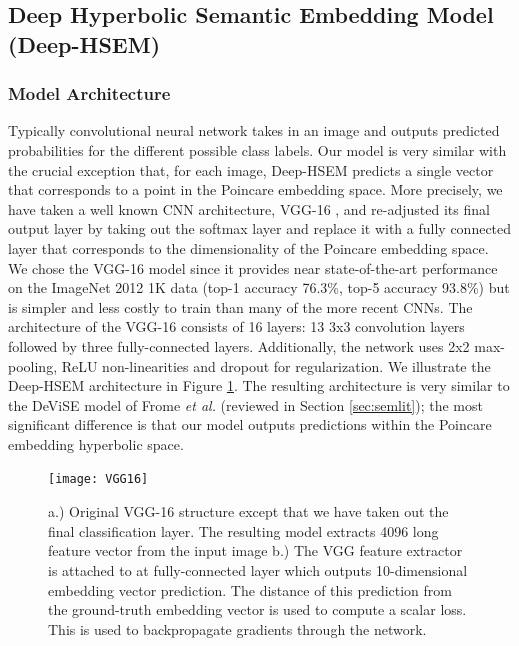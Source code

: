 \documentclass[12pt]{report}
\begin{document}
\subsection{Deep Hyperbolic Semantic Embedding Model \\ (Deep-HSEM)}
\subsubsection{Model Architecture}
Typically convolutional neural network takes in an image and outputs predicted probabilities for the different possible class labels. Our model is very similar with the crucial exception that, for each image, Deep-HSEM predicts a single vector that corresponds to a point in the Poincare embedding space. More precisely, we have taken a well known CNN architecture, VGG-16 \cite{Simonyan2014}, and re-adjusted its final output layer by taking out the softmax layer and replace it with a fully connected layer that corresponds to the dimensionality of the Poincare embedding space. We chose the VGG-16
model since it provides near state-of-the-art performance on the ImageNet 2012 1K data (top-1 accuracy 76.3\%, top-5 accuracy 93.8\%) but is simpler and less costly to train than many of the more recent CNNs. The architecture of the VGG-16 consists of 16 layers: 13 3x3 convolution layers followed by three fully-connected layers. Additionally, the network uses 2x2 max-pooling, ReLU non-linearities and dropout for regularization. We illustrate the Deep-HSEM architecture in Figure \ref{fig:dhsem}. The resulting architecture is very similar to the DeViSE model of Frome \textit{et al.} \cite{Frome2013} (reviewed in Section \ref{sec:semlit}); the most significant difference is that our model outputs predictions within the Poincare embedding hyperbolic space. 

\begin{figure}
  \centering
  \texttt{[image: VGG16]}
  \caption{a.) Original VGG-16 structure except that we have taken out the final classification layer. The resulting model extracts 4096 long feature vector from the input image b.) The VGG feature extractor is attached to at fully-connected layer which outputs 10-dimensional embedding vector prediction. The distance of this prediction from the ground-truth embedding vector is used to compute a scalar loss. This is used to backpropagate gradients through the network.}
  \label{fig:dhsem}
\end{figure}
\end{document}
